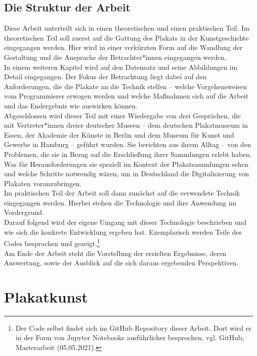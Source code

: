 \documentclass[a4paper,12pt,ngerman]{article}
\begin{document}
\subsection{Die Struktur der Arbeit}
Diese Arbeit unterteilt sich in einen theoretischen und einen praktischen Teil. Im theoretischen Teil soll zuerst auf die Gattung des Plakats in der Kunstgeschichte eingegangen werden. Hier wird in einer verkürzten Form auf die Wandlung der Gestaltung und die Ansprache der Betrachter*innen eingegangen werden. \\
In einem weiteren Kapitel wird auf den Datensatz und seine Abbildungen im Detail eingegangen. Der Fokus der Betrachtung liegt dabei auf den Anforderungen, die die Plakate an die Technik stellen -- welche Vorgehensweisen vom Programmierer erwogen werden und welche Maßnahmen sich auf die Arbeit und das Endergebnis wie auswirken können. \\
Abgeschlossen wird dieser Teil mit einer Wiedergabe von drei Gesprächen, die mit Vertreter*innen dreier deutscher Museen -- dem deutschen Plakatmuseum in Essen, der Akademie der Künste in Berlin und dem Museum für Kunst und Gewerbe in Hamburg -- geführt wurden. Sie berichten aus ihrem Alltag -- von den Problemen, die sie in Bezug auf die Erschließung ihrer Sammlungen erlebt haben. Was für Herausforderungen sie speziell im Kontext der Plakatsammlungen sehen und welche Schritte notwendig wären, um in Deutschland die Digitalisierung von Plakaten voranzubringen. \\
Im praktischen Teil der Arbeit soll dann zunächst auf die verwendete Technik eingegangen werden. Hierbei stehen die Technologie und ihre Anwendung im Vordergrund. \\
Darauf folgend wird der eigene Umgang mit dieser Technologie beschrieben und wie sich die konkrete Entwicklung ergeben hat. Exemplarisch werden Teile des Codes besprochen und gezeigt.\footnote{Der Code selbst findet sich im GitHub Repository dieser Arbeit. Dort wird er in der Form von Jupyter Notebooks ausführlicher besprochen, vgl. GitHub, Masterarbeit (05.05.2021).} \\
Am Ende der Arbeit steht die Vorstellung der erzielten Ergebnisse, deren Auswertung, sowie der Ausblick auf die sich daraus ergebenden Perspektiven. \\

\newpage

\section{Plakatkunst}
\end{document}
